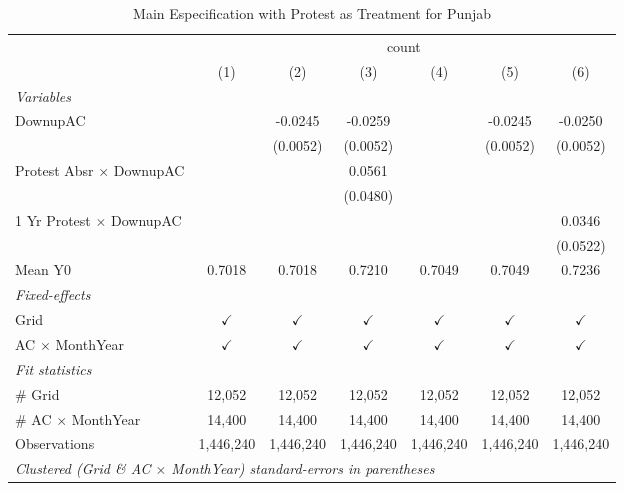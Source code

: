 
\begin{table}[htbp]
   \caption{\label{tab:protest_treat_main_pj} Main Especification with Protest as Treatment for Punjab}
   \centering
   \begin{tabular}{lcccccc}
      \tabularnewline \midrule \midrule
       & \multicolumn{6}{c}{count}\\
                                       & (1)           & (2)           & (3)           & (4)           & (5)           & (6)\\  
      \midrule
      \emph{Variables}\\
      DownupAC                         &               & -0.0245       & -0.0259       &               & -0.0245       & -0.0250\\   
                                       &               & (0.0052)      & (0.0052)      &               & (0.0052)      & (0.0052)\\   
      Protest Absr $\times$ DownupAC   &               &               & 0.0561        &               &               &   \\   
                                       &               &               & (0.0480)      &               &               &   \\   
      1 Yr Protest $\times$ DownupAC   &               &               &               &               &               & 0.0346\\   
                                       &               &               &               &               &               & (0.0522)\\   
      Mean Y0                          & 0.7018        & 0.7018        & 0.7210        & 0.7049        & 0.7049        & 0.7236\\  
      \midrule
      \emph{Fixed-effects}\\
      Grid                             & $\checkmark$  & $\checkmark$  & $\checkmark$  & $\checkmark$  & $\checkmark$  & $\checkmark$\\   
      AC $\times$ MonthYear            & $\checkmark$  & $\checkmark$  & $\checkmark$  & $\checkmark$  & $\checkmark$  & $\checkmark$\\   
      \midrule
      \emph{Fit statistics}\\
      \# Grid                          & 12,052        & 12,052        & 12,052        & 12,052        & 12,052        & 12,052\\  
      \# AC $\times$ MonthYear         & 14,400        & 14,400        & 14,400        & 14,400        & 14,400        & 14,400\\  
      Observations                     & 1,446,240     & 1,446,240     & 1,446,240     & 1,446,240     & 1,446,240     & 1,446,240\\  
      \midrule \midrule
      \multicolumn{7}{l}{\emph{Clustered (Grid \& AC $\times$ MonthYear) standard-errors in parentheses}}\\
   \end{tabular}
\end{table}


